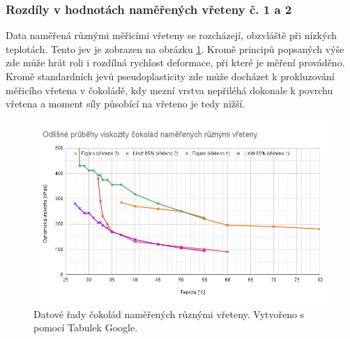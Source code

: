 \documentclass[12pt]{article}
\begin{document}
\subsubsection{Rozdíly v hodnotách naměřených vřeteny č. 1 a 2}
Data naměřená různými měřicími vřeteny se rozcházejí, obzvláště při nízkých teplotách. Tento jev je zobrazen na obrázku \ref{fig:ruzna_vretena}. Kromě principů popsaných výše zde může hrát roli i rozdílná rychlost deformace, při které je měření prováděno. Kromě standardních jevů pseudoplasticity zde může docházet k prokluzování měřicího vřetena v čokoládě, kdy mezní vrstva nepřiléhá dokonale k povrchu vřetena a moment síly působící na vřeteno je tedy nižší. 

\begin{figure}
    \centering
    \includegraphics[width = \linewidth]{figures/ruzna_vretena.png}
    \caption{Datové řady čokolád naměřených různými vřeteny. Vytvořeno s pomocí Tabulek Google.}
    \label{fig:ruzna_vretena}
\end{figure}


\newpage
\end{document}
